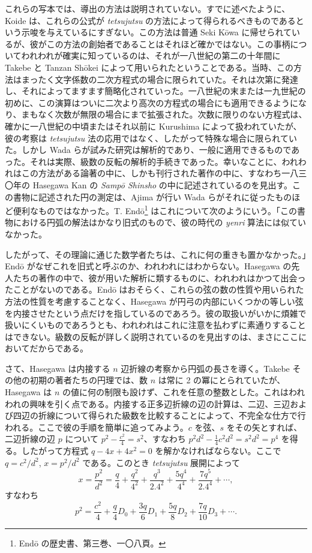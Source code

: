 \documentclass[11pt]{article}
\newcommand{\scanpage}[2]{\clearpage\setcounter{footnote}{0}\noindent{\footnotesize\color{gray}PDF #1 頁 · #2}\par\medskip}
\begin{document}
これらの写本では、導出の方法は説明されていない。すでに述べたように、Koide は、これらの公式が \emph{tetsujutsu} の方法によって得られるべきものであるという示唆を与えているにすぎない。この方法は普通 Seki Kōwa に帰せられているが、彼がこの方法の創始者であることはそれほど確かではない。この事柄についてわれわれが確実に知っているのは、それが一八世紀の第二の十年間に Takebe と Tanzan Shōkei によって用いられたということである。当時、この方法はまったく文字係数の二次方程式の場合に限られていた。それは次第に発達し、それによってますます簡略化されていった。一八世紀の末または一九世紀の初めに、この演算はついに二次より高次の方程式の場合にも適用できるようになり、まもなく次数が無限の場合にまで拡張された。次数に限りのない方程式は、確かに一八世紀の中頃またはそれ以前に Kurushima によって扱われていたが、彼の考察は \emph{tetsujutsu} 法の応用ではなく、したがって特殊な場合に限られていた。しかし Wada らが試みた研究は解析的であり、一般に適用できるものであった。それは実際、級数の反転の解析的手続きであった。幸いなことに、われわれはこの方法がある論著の中に、しかも刊行された著作の中に、すなわち一八三〇年の Hasegawa Kan の \emph{Sampō Shinsho} の中に記述されているのを見出す。この書物に記述された円の測定は、Ajima が行い Wada らがそれに従ったものほど便利なものではなかった。T. Endō\footnote{Endō の歴史書、第三巻、一〇八頁。} はこれについて次のようにいう。「この書物における円弧の解法はかなり旧式のもので、彼の時代の \emph{yenri} 算法には似ていなかった。

\scanpage{0293}{印刷頁 279}
したがって、その理論に通じた数学者たちは、これに何の重きも置かなかった。」Endō がなぜこれを旧式と呼ぶのか、われわれにはわからない。Hasegawa の先人たちの著作の中で、彼が用いた解析に類するものに、われわれはかつて出会ったことがないのである。Endō はおそらく、これらの弦の数の性質や用いられた方法の性質を考慮することなく、Hasegawa が円弓の内部にいくつかの等しい弦を内接させたという点だけを指しているのであろう。彼の取扱いがいかに煩雑で扱いにくいものであろうとも、われわれはこれに注意を払わずに素通りすることはできない。級数の反転が詳しく説明されているのを見出すのは、まさにここにおいてだからである。

さて、Hasegawa は内接する $n$ 辺折線の考察から円弧の長さを導く。Takebe その他の初期の著者たちの円理では、数 $n$ は常に 2 の冪にとられていたが、Hasegawa は $n$ の値に何の制限も設けず、これを任意の整数とした。これはわれわれの興味を引く点である。内接する正多辺折線の辺の計算は、二辺、三辺および四辺の折線について得られた級数を比較することによって、不完全な仕方で行われる。ここで彼の手順を簡単に追ってみよう。$c$ を弦、$s$ をその矢とすれば、二辺折線の辺 $p$ について $p^2 - \frac{c^2}{4} = s^2$、すなわち $p^2d^2 - \frac{1}{4}c^2d^2 = s^2d^2 = p^4$ を得る。したがって方程式 $q - 4x + 4x^2 = 0$ を解かなければならない。ここで $q = c^2/d^2$, $x = p^2/d^2$ である。このとき \emph{tetsujutsu} 展開によって
\[
x = \frac{p^2}{d^2} = \frac{q}{4} + \frac{q^2}{4^2} + \frac{q^3}{2.4^2} + \frac{5q^4}{4^4} + \frac{7q^5}{2.4^4} + \cdots,
\]
すなわち
\[
p^2 = \frac{c^2}{4} + \frac{q}{4}D_0 + \frac{3q}{6}D_1 + \frac{5q}{8}D_2 + \frac{7q}{10}D_3 + \cdots.
\]
\end{document}
